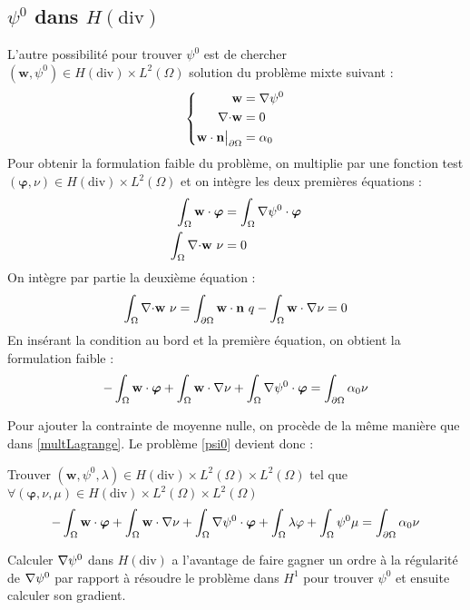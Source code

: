 \subsection{$\psi^0$ dans $H(\mathrm{div})$}

L'autre possibilité pour trouver $\psi^0$ est de chercher $(\mathbf{w},\psi^0)\in H(\mathrm{div})\times L^2(\Omega)$ solution du problème mixte suivant :
\begin{equation*}
\left\{\begin{aligned}
\mathbf{w} &= {\nabla} \psi^0\\
{\nabla\cdot} \mathbf{w} &= 0\\
\mathbf{w}\cdot \mathbf{n}{\big\rvert_{\partial\Omega}} &= \alpha_0
\end{aligned}\right.
\end{equation*}
Pour obtenir la formulation faible du problème, on multiplie par une fonction test $(\bm{\varphi},\nu)\in H(\mathrm{div})\times L^2(\Omega)$ et on intègre les deux premières équations :
\begin{align*}
\int_\Omega \mathbf{w}\cdot\bm{\varphi} &= \int_\Omega {\nabla}\psi^0\cdot\bm{\varphi}\\
\int_\Omega {\nabla\cdot} \mathbf{w}\ \nu &= 0
\end{align*}
On intègre par partie la deuxième équation :
\[ \int_\Omega {\nabla\cdot} \mathbf{w}\ \nu = \int_{\partial\Omega} \mathbf{w}\cdot \mathbf{n}\ q - \int_\Omega \mathbf{w}\cdot{\nabla}\nu = 0  \]
En insérant la condition au bord et la première équation, on obtient la formulation faible :
\[ -\int_\Omega \mathbf{w}\cdot\bm{\varphi} + \int_\Omega \mathbf{w}\cdot{\nabla}\nu + \int_\Omega {\nabla}\psi^0\cdot\bm{\varphi}  = \int_{\partial\Omega} \alpha_0\nu \]

Pour ajouter la contrainte de moyenne nulle, on procède de la même manière que dans \ref{multLagrange}. Le problème \ref{psi0} devient donc :
\begin{pb}\label{fvpsidiv}
Trouver $(\mathbf{w},\psi^0,\lambda)\in H(\mathrm{div})\times L^2(\Omega)\times L^2(\Omega)$ tel que $\forall (\bm{\varphi},\nu,\mu)\in H(\mathrm{div})\times L^2(\Omega)\times L^2(\Omega)$
\begin{equation*}
-\int_\Omega \mathbf{w}\cdot\bm{\varphi} + \int_\Omega \mathbf{w}\cdot{\nabla}\nu + \int_\Omega {\nabla}\psi^0\cdot\bm{\varphi} + \int_\Omega \lambda\varphi + \int_\Omega \psi^0\mu = \int_{\partial\Omega} \alpha_0\nu
\end{equation*}\end{pb}

\begin{rk}
Calculer ${\nabla}\psi^0$ dans $H(\mathrm{div})$ a l'avantage de faire gagner un ordre à la régularité de ${\nabla}\psi^0$ par rapport à résoudre le problème dans $H^1$ pour trouver $\psi^0$ et ensuite calculer son gradient.
\end{rk}
